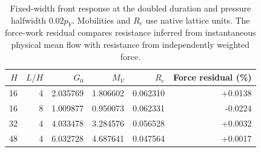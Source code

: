 \begin{table}[htbp]\centering\small
\caption{Fixed-width front response at the doubled duration and pressure halfwidth $0.02p_Y$. Mobilities and $R_e$ use native lattice units. The force-work residual compares resistance inferred from instantaneous physical mean flow with resistance from independently weighted force.}
\begin{tabular}{rrrrrr}\toprule
$H$ & $L/H$ & $G_0$ & $M_V$ & $R_e$ & Force residual (\%) \\ \midrule
16 & 4 & 2.035769 & 1.806602 & 0.062310 & +0.0138 \\
16 & 8 & 1.009877 & 0.950073 & 0.062331 & -0.0224 \\
32 & 4 & 4.033478 & 3.284576 & 0.056528 & +0.0032 \\
48 & 4 & 6.032728 & 4.687641 & 0.047564 & +0.0017 \\
\bottomrule\end{tabular}\end{table}
